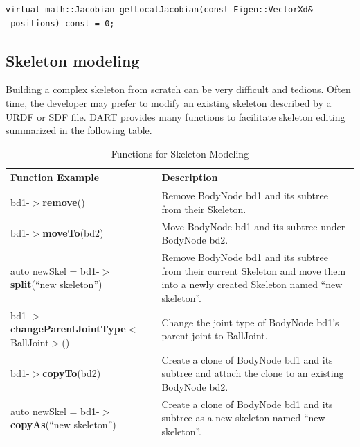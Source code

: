 \begin{lstlisting}[caption=Joint.h]
virtual math::Jacobian getLocalJacobian(const Eigen::VectorXd&
_positions) const = 0;
\end{lstlisting}






\subsection{Skeleton modeling}
Building a complex skeleton from scratch can be very
difficult and tedious. Often time, the developer may prefer to modify an
existing skeleton described by a URDF or SDF file. DART provides many
functions to facilitate skeleton editing summarized in the following
table.

\begin{table}[h]
\centering
\caption{Functions for Skeleton Modeling}
\begin{tabular}{|L{3.3in}|L{2.7in}|}
  \hline
  \textbf{Function Example} & \textbf{Description} \\
  \hline
  bd1-$>$\textbf{remove}() & Remove BodyNode bd1 and its subtree from their Skeleton.  \\
  \hline
   bd1-$>$\textbf{moveTo}(bd2) & Move BodyNode bd1 and its subtree under BodyNode bd2.  \\
  \hline
 auto newSkel = bd1-$>$\textbf{split}(``new skeleton'') & Remove BodyNode bd1 and its subtree from their current Skeleton and move them into a newly created Skeleton named ``new skeleton''.  \\
  \hline
 bd1-$>$\textbf{changeParentJointType}$<$BallJoint$>$() & Change the joint type of BodyNode bd1's parent joint to BallJoint.  \\
  \hline
bd1-$>$\textbf{copyTo}(bd2) & Create a clone of BodyNode bd1 and its subtree
                   and attach the clone to an existing BodyNode bd2. \\
  \hline
 auto newSkel = bd1-$>$\textbf{copyAs}(``new skeleton'') & Create a
                                                         clone of
                                                         BodyNode bd1
                                                         and its
                                                         subtree as a new skeleton named ``new skeleton''.  \\
  \hline
\end{tabular}
\label{tab:skeletonEdit}
\end{table}

